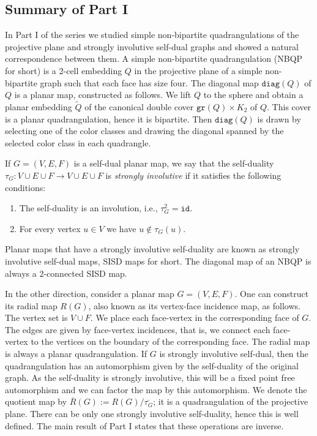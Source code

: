 \documentclass{article}
\newcommand{\diag}[0]{\mathtt{diag}}
\newcommand{\gr}{\mathtt{gr}}
\newcommand{\id}{\mathtt{id}}
\begin{document}
\subsection{Summary of Part I}




In Part I of the series we studied simple non-bipartite quadrangulations of the projective plane and strongly involutive self-dual graphs and showed a natural correspondence between them. A simple non-bipartite quadrangulation (NBQP for short) is a 2-cell embedding $Q$ in the projective plane of a simple non-bipartite graph such that each face has size four. The diagonal map $\diag(Q)$ of $Q$ is a planar map, constructed as follows. We lift $Q$ to the sphere and obtain a planar embedding $\widetilde Q$ of the canonical double cover $\gr(Q)\times K_2$ of $Q$. This cover is a planar quadrangulation, hence it is bipartite. Then $\diag(Q)$ is drawn by selecting one of the color classes and drawing the diagonal spanned by the selected color class in each quadrangle. 

If $G=(V,E,F)$ is a self-dual planar map, we say that the  self-duality  $\tau_G:V\cup E\cup F \rightarrow V\cup E\cup F$ is \emph{strongly involutive} if it satisfies the following conditions:
\begin{enumerate}
    \item[1)]  The self-duality is an involution, i.e., $\tau_G^2=\id$.
    \item[2)]  For every vertex $u\in V$ we have $u \notin \tau_G(u)$.
\end{enumerate}
Planar maps that have a strongly involutive self-duality are known as strongly involutive self-dual maps, SISD maps for short.
The diagonal map of an NBQP is always a 2-connected SISD map. 

In the other direction, consider a planar map $G=(V,E,F)$. One can construct its radial map $R(G)$, also known as its vertex-face incidence map, as follows. The vertex set is $V\cup F$. We place each face-vertex in the corresponding face of $G$. The edges are given by face-vertex incidences, that is, we connect each face-vertex to the vertices on the boundary of the corresponding face. The radial map is always a planar quadrangulation. If $G$ is strongly involutive self-dual, then the quadrangulation  has an automorphism given by the self-duality of the original graph. As the self-duality is strongly involutive, this will be a fixed point free automorphism and we can factor the map by this automorphism. We denote the quotient map by $\overline R(G):=R(G)/\overline{\tau_G}$; it is a quadrangulation of the projective plane. There can be only one strongly involutive self-duality, hence this is well defined. The main result of Part I states that these operations are inverse.
\end{document}
